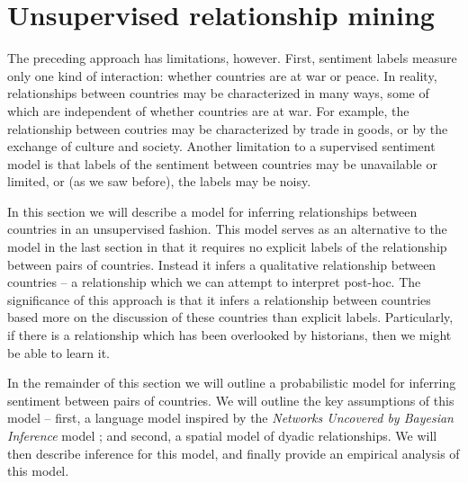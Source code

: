 \section*{Unsupervised relationship mining}


The preceding approach has limitations, however.  First, sentiment
labels measure only one kind of interaction: whether countries are at
war or peace.  In reality, relationships between countries may be
characterized in many ways, some of which are independent of whether
countries are at war.  For example, the relationship between coutries
may be characterized by trade in goods, or by the exchange of culture
and society. Another limitation to a supervised sentiment model is
that labels of the sentiment between countries may be unavailable or
limited, or (as we saw before), the labels may be noisy.

In this section we will describe a model for inferring relationships
between countries in an unsupervised fashion.  This model serves as an
alternative to the model in the last section in that it requires no
explicit labels of the relationship between pairs of countries.
Instead it infers a qualitative relationship between countries -- a
relationship which we can attempt to interpret post-hoc.  The
significance of this approach is that it infers a relationship between
countries based more on the discussion of these countries than
explicit labels.  Particularly, if there is a relationship which has
been overlooked by historians, then we might be able to learn it.

In the remainder of this section we will outline a probabilistic model
for inferring sentiment between pairs of countries.  We will outline
the key assumptions of this model -- first, a language model inspired
by the \emph{Networks Uncovered by Bayesian Inference} model
\citep{chang:2009nubbi}; and second, a spatial model of dyadic
relationships. We will then describe inference for this model, and
finally provide an empirical analysis of this model.

